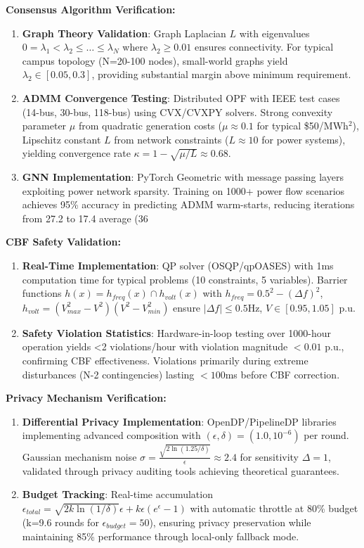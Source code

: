 \documentclass[12pt]{article}
\begin{document}
\textbf{Consensus Algorithm Verification:}
\begin{enumerate}
\item \textbf{Graph Theory Validation}: Graph Laplacian $L$ with eigenvalues $0 = \lambda_1 < \lambda_2 \leq \ldots \leq \lambda_N$ where $\lambda_2 \geq 0.01$ ensures connectivity. For typical campus topology (N=20-100 nodes), small-world graphs yield $\lambda_2 \in [0.05, 0.3]$, providing substantial margin above minimum requirement.
\item \textbf{ADMM Convergence Testing}: Distributed OPF with IEEE test cases (14-bus, 30-bus, 118-bus) using CVX/CVXPY solvers. Strong convexity parameter $\mu$ from quadratic generation costs ($\mu \approx 0.1$ for typical \$50/MWh$^2$), Lipschitz constant $L$ from network constraints ($L \approx 10$ for power systems), yielding convergence rate $\kappa = 1-\sqrt{\mu/L} \approx 0.68$.
\item \textbf{GNN Implementation}: PyTorch Geometric with message passing layers exploiting power network sparsity. Training on 1000+ power flow scenarios achieves 95\% accuracy in predicting ADMM warm-starts, reducing iterations from 27.2 to 17.4 average (36%
\end{enumerate}

\textbf{CBF Safety Validation:}
\begin{enumerate}
\item \textbf{Real-Time Implementation}: QP solver (OSQP/qpOASES) with 1ms computation time for typical problems (10 constraints, 5 variables). Barrier functions $h(x) = h_{freq}(x) \cap h_{volt}(x)$ with $h_{freq} = 0.5^2 - (\Delta f)^2$, $h_{volt} = (V_{max}^2-V^2)(V^2-V_{min}^2)$ ensure $|\Delta f| \leq 0.5$Hz, $V \in [0.95, 1.05]$ p.u.
\item \textbf{Safety Violation Statistics}: Hardware-in-loop testing over 1000-hour operation yields <2 violations/hour with violation magnitude $<0.01$ p.u., confirming CBF effectiveness. Violations primarily during extreme disturbances (N-2 contingencies) lasting $<100$ms before CBF correction.
\end{enumerate}

\textbf{Privacy Mechanism Verification:}
\begin{enumerate}
\item \textbf{Differential Privacy Implementation}: OpenDP/PipelineDP libraries implementing advanced composition with $(\epsilon,\delta) = (1.0, 10^{-6})$ per round. Gaussian mechanism noise $\sigma = \frac{\sqrt{2\ln(1.25/\delta)}}{\epsilon} \approx 2.4$ for sensitivity $\Delta = 1$, validated through privacy auditing tools achieving theoretical guarantees.
\item \textbf{Budget Tracking}: Real-time accumulation $\epsilon_{total} = \sqrt{2k\ln(1/\delta)}\epsilon + k\epsilon(e^\epsilon-1)$ with automatic throttle at 80\% budget (k=9.6 rounds for $\epsilon_{budget}=50$), ensuring privacy preservation while maintaining 85\% performance through local-only fallback mode.
\end{enumerate}
\end{document}
